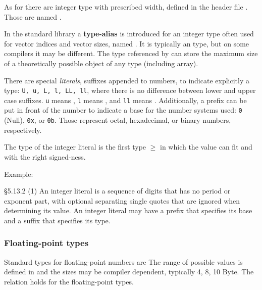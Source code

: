 \begin{rem}
  As\marginpar{[\cxx{11}]} for  there are integer type with prescribed width, defined in the header file . Those are named .
\end{rem}

\begin{rem}
  In the standard library a \textbf{type-alias} is introduced for an integer type often used for vector indices and vector sizes, named . It is typically an  type, but on some compilers it may be different. The type referenced by  can store the maximum size of a theoretically possible object of any type (including array).
\end{rem}

There are special \emph{literals}, suffixes appended to numbers, to indicate explicitly a type: \texttt{U, u, L, l, LL, ll}, where there is no difference between lower and upper case suffixes. \texttt{u} means , \texttt{l} means , and \texttt{ll} means . Additionally, a prefix can be put in front of the number to indicate a base for the number systems used: \texttt{0} (Null), \texttt{0x}, or \texttt{0b}. Those represent octal, hexadecimal, or binary numbers, respectively.

\begin{rem}
  The type of the integer literal is the first type $\geq$ in which the value can fit and with the right signed-ness.
\end{rem}

Example:

\begin{standard}{\S 5.13.2 (1)}
  An integer literal is a sequence of digits that has no period or exponent part, with optional separating single quotes that are ignored when determining its value. An integer literal may have a prefix that specifies its base and a suffix that specifies its type.
\end{standard}


\subsubsection{Floating-point types}
Standard types for floating-point numbers are
%
%
The range of possible values is defined in  and the sizes may be compiler dependent, typically 4, 8, 10 Byte. The relation
%
%
holds for the floating-point types.

